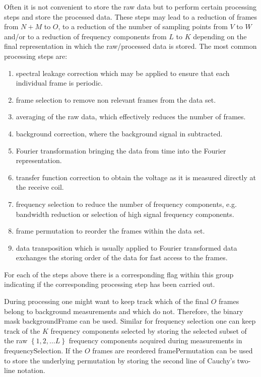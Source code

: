 \documentclass[landscape,a4paper]{article} %
\newcommand{\inlvar}[1]{{\ttfamily#1}}
\begin{document}
\begin{multicols}{2}
Often it is not convenient to store the raw data but to perform certain processing steps and store the processed data. These steps may lead to a reduction of frames from $N+M$ to $O$, to a reduction of the number of sampling points from $V$ to $W$ and/or to a reduction of frequency components from $L$ to $K$ depending on the final representation in which the raw/processed data is stored. The most common processing steps are:
\begin{enumerate}
	\item spectral leakage correction which may be applied to ensure that each individual frame is periodic.
	\item frame selection to remove non relevant frames from the data set.
	\item averaging of the raw data, which effectively reduces the number of frames.
	\item background correction, where the background signal in subtracted.
	\item Fourier transformation bringing the data from time into the Fourier representation.
	\item transfer function correction to obtain the voltage as it is measured directly at the receive coil.
	\item frequency selection to reduce the number of frequency components, e.g. bandwidth reduction or selection of high signal frequency components.
	\item frame permutation to reorder the frames within the data set.
	\item data transposition which is usually applied to Fourier transformed data exchanges the storing order of the data for fast access to the frames.
\end{enumerate}
For each of the steps above there is a corresponding flag within this group indicating if the corresponding processing step has been carried out. 

During processing one might want to keep track which of the final $O$ frames belong to background measurements and which do not. Therefore, the binary mask \inlvar{backgroundFrame} can be used. Similar for frequency selection one can keep track of the $K$ frequency components selected by storing the selected subset of the raw $\left\{ 1,2,\dots L \right\}$ frequency components acquired during measurements in \inlvar{frequencySelection}. If the $O$ frames are reordered \inlvar{framePermutation} can be used to store the underlying permutation by storing the second line of Cauchy's two-line notation. 


\end{multicols}
\end{document}
